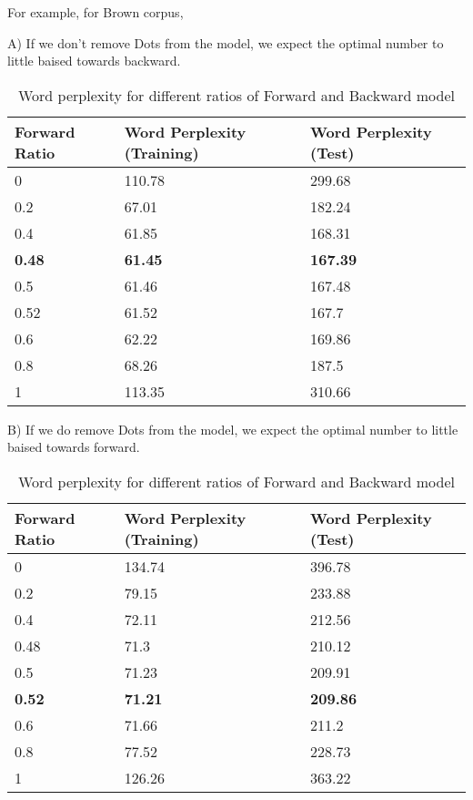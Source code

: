 For example, for Brown corpus, 

A) If we don't remove Dots from the model, we expect the optimal number to little baised towards backward. 

\begin{center}	
    \begin{table}[ht]
    \centering
    \begin{tabular}{| l | l | l |}
    \hline
    Forward Ratio  &  Word Perplexity (Training) & Word Perplexity (Test)   \\ \hline
0 &	110.78 &	299.68 \\ \hline
0.2 & 	67.01 & 182.24  \\ \hline
0.4 & 	61.85 & 	168.31 \\ \hline
{\bfseries 0.48} & 	{\bfseries 61.45}	 & {\bfseries 167.39}\\ \hline
0.5	 & 61.46 & 	167.48 \\ \hline
0.52 & 	61.52 & 	167.7 \\ \hline
0.6 & 	62.22 & 	169.86 \\ \hline
0.8 & 	68.26 & 	187.5 \\ \hline
1 & 	113.35 & 	310.66 \\ \hline
    \end{tabular}
    \caption{Word perplexity for different ratios of Forward and Backward model}
    \end{table}%
\end{center}

B) If we do remove Dots from the model, we expect the optimal number to little baised towards forward. 

\begin{center}	
    \begin{table}[ht]
    \centering
    \begin{tabular}{| l | l | l |}
    \hline
    Forward Ratio  &  Word Perplexity (Training) & Word Perplexity (Test)   \\ \hline
0 &	134.74  & 396.78 \\ \hline
0.2	& 79.15 &	233.88 \\ \hline
0.4 & 72.11 &	212.56 \\ \hline
0.48	 & 71.3	 & 210.12 \\ \hline
0.5 & 71.23 &	209.91 \\ \hline
{\bfseries 0.52} & {\bfseries 71.21} & {\bfseries 209.86}\\ \hline
0.6	 & 71.66	 & 211.2\\ \hline
0.8 & 	77.52	 & 228.73\\ \hline
1	 & 126.26	 & 363.22\\ \hline
    \end{tabular}
    \caption{Word perplexity for different ratios of Forward and Backward model}
    \end{table}%
\end{center}

